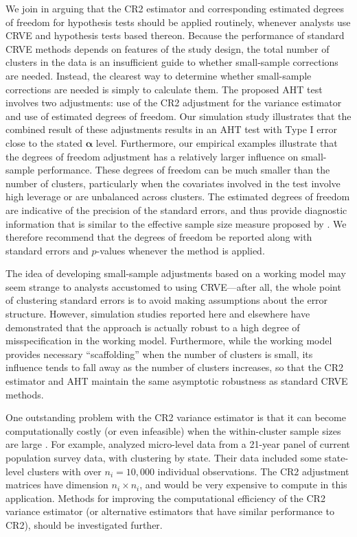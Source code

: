 \documentclass[12pt]{article}\usepackage[]{graphicx}\usepackage[]{color}
\newcommand{\bs}{\boldsymbol}
\begin{document}
We join \citet{Imbens2015robust} in arguing that the CR2 estimator and corresponding estimated degrees of freedom for hypothesis tests should be applied routinely, whenever analysts use CRVE and hypothesis tests based thereon. 
Because the performance of standard CRVE methods depends on features of the study design, the total number of clusters in the data is an insufficient guide to whether small-sample corrections are needed. 
Instead, the clearest way to determine whether small-sample corrections are needed is simply to calculate them.
The proposed AHT test involves two adjustments: use of the CR2 adjustment for the variance estimator and use of estimated degrees of freedom. 
Our simulation study illustrates that the combined result of these adjustments results in an AHT test with Type I error close to the stated $\bs\alpha$ level. 
Furthermore, our empirical examples illustrate that the degrees of freedom adjustment has a relatively larger influence on small-sample performance.
These degrees of freedom can be much smaller than the number of clusters, particularly when the covariates involved in the test involve high leverage or are unbalanced across clusters.
The estimated degrees of freedom are indicative of the precision of the standard errors, and thus provide diagnostic information that is similar to the effective sample size measure proposed by \citet{Carter2013asymptotic}. 
We therefore recommend that the degrees of freedom be reported along with standard errors and $p$-values whenever the method is applied.

The idea of developing small-sample adjustments based on a working model may seem strange to analysts accustomed to using CRVE---after all, the whole point of clustering standard errors is to avoid making assumptions about the error structure.
However, simulation studies reported here and elsewhere \citep{Tipton2015small-t, Tipton2015small-F} have demonstrated that the approach is actually robust to a high degree of misspecification in the working model. 
Furthermore, while the working model provides necessary ``scaffolding'' when the number of clusters is small, its  influence tends to fall away as the number of clusters increases, so that the CR2 estimator and AHT maintain the same asymptotic robustness as standard CRVE methods. 

One outstanding problem with the CR2 variance estimator is that it can become computationally costly (or even infeasible) when the within-cluster sample sizes are large \citep{Mackinnon2014wild}. 
For example, \citet{Bertrand2004how} analyzed micro-level data from a 21-year panel of current population survey data, with clustering by state. Their data included some state-level clusters with over $n_i = 10,000$ individual observations. 
The CR2 adjustment matrices have dimension $n_i \times n_i$, and would be very expensive to compute in this application. 
Methods for improving the computational efficiency of the CR2 variance estimator (or alternative estimators that have similar performance to CR2), should be investigated further. 
\end{document}
